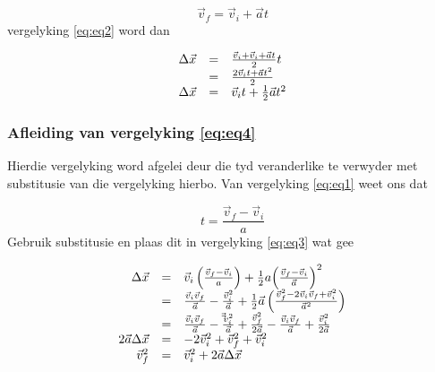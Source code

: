     \begin{equation*}
    \vec{v}_{f}=\vec{v}_{i}+\vec{a}t
      \end{equation*}
          \label{m38796*id76925}vergelyking \ref{eq:eq2} word dan\par 
          \label{m38796*id76932}\nopagebreak\noindent{}
            
    \begin{equation*}
    \begin{array}{ccc}\hfill \Delta \vec{x}& =& \frac{\vec{v}_{i}+\vec{v}_{i}+\vec{a}t}{2}t\hfill \\ & =& \frac{2\vec{v}_{i}t+\vec{a}{t}^{2}}{2}\hfill \\ \hfill \Delta \vec{x}& =& \vec{v}_{i}t+\frac{1}{2}\vec{a}{t}^{2}\hfill \end{array}
      \end{equation*}
        \label{m38796*uid138}


\subsubsection*{Afleiding van vergelyking \ref{eq:eq4}}
            \nopagebreak
Hierdie vergelyking word afgelei deur die tyd veranderlike te verwyder met substitusie van die vergelyking hierbo. Van vergelyking \ref{eq:eq1} weet ons dat\par 
          \label{m38796*id77095}\nopagebreak\noindent{}
            
    \begin{equation*}
    t=\frac{\vec{v}_{f}-\vec{v}_{i}}{a}
      \end{equation*}
          \label{m38796*id77132}Gebruik substitusie en plaas dit in vergelyking \ref{eq:eq3} wat gee\par 
          \label{m38796*uid139}\nopagebreak\noindent{}
            
    \begin{equation*}
    \begin{array}{ccc}
\hfill \Delta \vec{x}& =& \vec{v}_{i}\left(\frac{\vec{v}_{f}-\vec{v}_{i}}{a}\right)+\frac{1}{2}a{\left(\frac{\vec{v}_{f}-\vec{v}_{i}}{\vec{a}}\right)}^{2}\hfill \\ 
& =& \frac{\vec{v}_{i}\vec{v}_{f}}{\vec{a}} - \frac{\vec{v}_{i}^{2}}{\vec{a}}+\frac{1}{2}\vec{a}\left(\frac{\vec{v}_{f}^{2}-2\vec{v}_{i}\vec{v}_{f}+\vec{v}_{i}^{2}}{\vec{a}^{2}}\right)\hfill \\ 
& =& \frac{\vec{v}_{i}\vec{v}_{f}}{\vec{a}}-\frac{\vec\vec{v}_{i}^{2}}{\vec{a}}+\frac{\vec{v}_{f}^{2}}{2\vec{a}}-\frac{\vec{v}_{i}\vec{v}_{f}}{\vec{a}}+\frac{\vec{v}_{i}^{2}}{2\vec{a}}\hfill \\
 \hfill 2\vec{a}\Delta \vec{x}& =& -2\vec{v}_{i}^{2}+\vec{v}_{f}^{2}+\vec{v}_{i}^{2}\hfill \\ \hfill \vec{v}_{f}^{2}& =& \vec{v}_{i}^{2}+2\vec{a}\Delta \vec{x}\hfill
 \end{array}
      \end{equation*}

